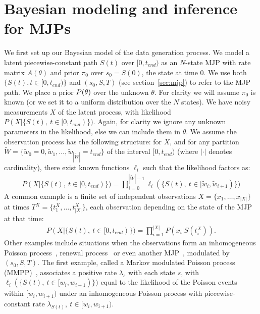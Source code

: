 \section{Bayesian modeling and inference for MJPs}
\label{sec:bayes_model}
We first set up our Bayesian model of the data generation process. 
We model a latent piecewise-constant path $S(t)$ over $[0,t_{end})$ as an $N$-state MJP with rate matrix $A(\theta)$ and prior $\pi_0$ over $s_0 = S(0)$, the state at time $0$. 
We use both $\{S(t), t \in [0,t_{end})\}$ and $(s_0,S,T)$ (see section~\ref{sec:mjp}) to refer to the MJP path.
We place a prior $P(\theta)$ over the unknown $\theta$. 
For clarity we will assume $\pi_0$ is known (or we set it to a uniform distribution over the $N$ states). 
We have noisy measurements $X$ of the latent process, with likelihood $P(X|\{S(t),\ t \in [0,t_{end})\})$.
Again, for clarity we ignore any unknown parameters in the likelihood, else we can include them in $\theta$.
We assume the observation process has the following structure: for $X$, and for any partition $\tilde{W} = \{\tilde{w}_0 = 0, \tilde{w}_1, \dotsc, \tilde{w}_{|\tilde{W}|}=t_{end}\}$ of the interval $[0,t_{end})$ (where $|\cdot|$ denotes cardinality), there exist known functions $\ell_i$ such that the likelihood factors as:
\begin{align}
  \label{eq:lik_factor}
  P(X|\{S(t),\ t \in [0,t_{end})\}) = \prod_{i=0}^{|\tilde{W}|-1} \ell_i(\{S(t),\ t \in [\tilde{w}_{i},\tilde{w}_{i+1})\})
\end{align}
A common example is a finite set of independent observations $X = \{x_1,\dotsc,x_{|X|}\}$ at times $T^X = \{t^X_1,\dotsc, t^X_{|X|}\}$, each observation depending on the state of the MJP at that time:
\begin{align}
  \label{eq:lik_iid}
  P(X|\{S(t),\ t \in [0,t_{end})\}) = \prod_{i=1}^{|X|} P(x_i|S(t^X_i)).
\end{align}
Other examples include situations when the observations form an inhomogeneous Poisson process~\citep{FearnSher2006}, renewal process~\citep{rao2011gaussian} or even another MJP~\citep{Nodelman+al:UAI02,RaoTeh13}, modulated by $(s_0, S, T)$.
The first example, called a Markov modulated Poisson process (MMPP)~\citep{scottmmpp03}, associates a positive rate $\lambda_s$ with each state $s$, with $\ell_i(\{S(t),\ t \in [w_{i},w_{i+1})\})$ equal to the likelihood of the Poisson events within $[w_{i},w_{i+1})$ under an inhomogeneous Poisson process with piecewise-constant rate $\lambda_{S(t)},\ t \in [w_{i},w_{i+1})$.

